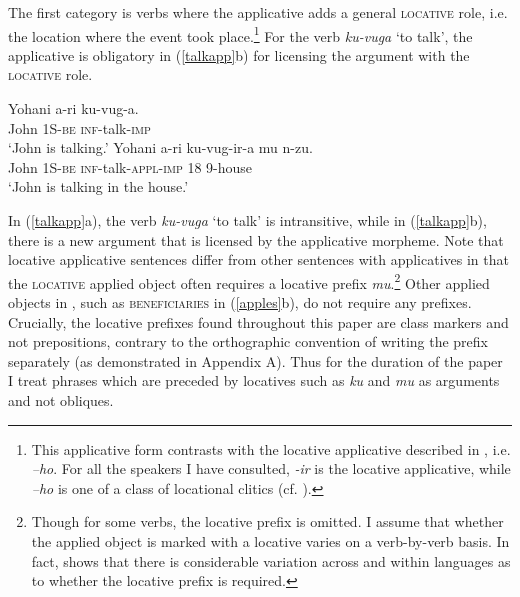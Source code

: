 \documentclass[output=paper]{langsci/langscibook}
\begin{document}
The first category is verbs where the applicative adds a general {\scshape locative} role, i.e. the location where the event took place.\footnote{This applicative form contrasts with the locative applicative described in \citet{kimenyi:1980,zeller:2006,zellerngoboka:2006}, i.e. \emph{--ho}. For all the speakers I have consulted, \emph{-ir} is the locative applicative, while \emph{--ho} is one of a class of locational clitics (cf. ).} For the verb \emph{ku-vuga} `to talk', the applicative is obligatory in (\ref{talkapp}b) for licensing the argument with the {\scshape locative} role. 
	\begin{exe}
		\ex\label{talkapp}\begin{xlist}
		\ex\gll Yohani a-ri ku-vug-a.\\	
				John 1S-{\scshape be} {\scshape inf}-talk-{\scshape imp}\\
				\glt `John is talking.'
		\ex\gll Yohani a-ri ku-vug-ir-a mu n-zu.\\
			John 1S-{\scshape be} {\scshape inf}-talk-{\scshape appl-imp} 18 9-house\\
				\glt `John is talking in the house.'
	\end{xlist}
	\end{exe}
 In (\ref{talkapp}a), the verb \emph{ku-vuga} `to talk' is intransitive, while in (\ref{talkapp}b), there is a new argument that is licensed by the applicative morpheme. Note that locative applicative sentences differ from other sentences with applicatives in that the {\scshape locative} applied object often requires a locative prefix \emph{mu}.\footnote{Though for some verbs, the locative prefix is omitted. I assume that whether the applied object is marked with a locative varies on a verb-by-verb basis. In fact, \citet{rugemalira:2003} shows that there is considerable variation across and within languages as to whether the locative prefix is required.} Other applied objects in , such as {\scshape beneficiaries} in (\ref{apples}b), do not require any prefixes. Crucially, the locative prefixes found throughout this paper are class markers and not prepositions, contrary to the  orthographic convention of writing the prefix separately (as demonstrated in Appendix A). Thus for the duration of the paper I treat phrases which are preceded by locatives such as \emph{ku} and \emph{mu} as arguments and not obliques.  
\end{document}
